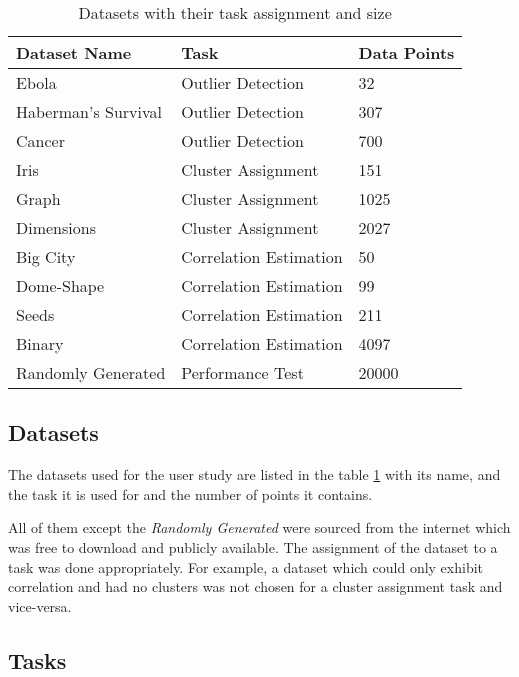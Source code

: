 \documentclass[journal]{vgtc}                %
\begin{document}
\begin{table}
\begin{center}
\def\arraystretch{1.25}%
\begin{tabular}{ |l|l|l| } 
 \hline
 \textbf{Dataset Name} & \textbf{Task} & \textbf{Data Points} \\ 
 \hline
 \hline
 Ebola & Outlier Detection & 32 \\ 
 \hline
 Haberman's Survival & Outlier Detection & 307 \\ 
 \hline
 Cancer & Outlier Detection & 700 \\ 
 \hline
 Iris & Cluster Assignment & 151 \\ 
 \hline
 Graph & Cluster Assignment & 1025 \\ 
 \hline
 Dimensions & Cluster Assignment & 2027 \\ 
 \hline
 Big City & Correlation Estimation & 50 \\ 
 \hline
 Dome-Shape & Correlation Estimation & 99 \\ 
 \hline 
 Seeds & Correlation Estimation & 211 \\ 
 \hline
 Binary & Correlation Estimation & 4097 \\ 
 \hline
 Randomly Generated & Performance Test & 20000 \\ 
 \hline
\end{tabular}
\caption{Datasets with their task assignment and size}
\label{table:1}
\end{center}
\end{table}


\subsection{Datasets}

The datasets used for the user study are listed in the table \ref{table:1} with its name, and the task it is used for and the number of points it contains.

All of them except the \textit{Randomly Generated} were sourced from the internet which was free to download and publicly available. The assignment of the dataset to a task was done appropriately. For example, a dataset which could only exhibit correlation and had no clusters was not chosen for a cluster assignment task and vice-versa.


\subsection{Tasks}
\end{document}
